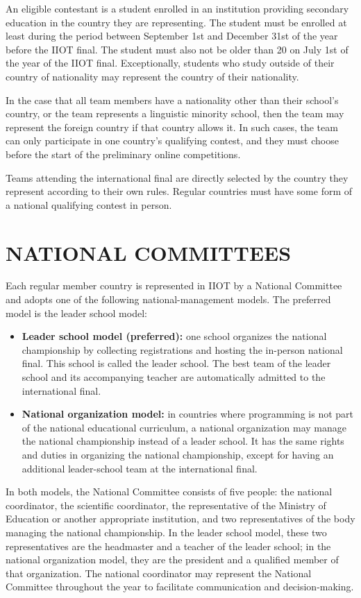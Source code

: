 \documentclass{article}
\begin{document}
An eligible contestant is a student enrolled in an institution providing secondary education in the country they are representing. The student must be enrolled at least during the period between September 1st and December 31st of the year before the IIOT final. The student must also not be older than 20 on July 1st of the year of the IIOT final. Exceptionally, students who study outside of their country of nationality may represent the country of their nationality. 

In the case that all team members have a nationality other than their school's country, or the team represents a linguistic minority school, then the team may represent the foreign country if that country allows it. In such cases, the team can only participate in one country's qualifying contest, and they must choose before the start of the preliminary online competitions. 

Teams attending the international final are directly selected by the country they represent according to their own rules. Regular countries must have some form of a national qualifying contest in person.

\section{NATIONAL COMMITTEES}

Each regular member country is represented in IIOT by a National Committee and adopts one of the following national-management models. The preferred model is the leader school model:

\begin{itemize}
    \item \textbf{Leader school model (preferred):} one school organizes the national championship by collecting registrations and hosting the in-person national final. This school is called the leader school. The best team of the leader school and its accompanying teacher are automatically admitted to the international final.
    \item \textbf{National organization model:} in countries where programming is not part of the national educational curriculum, a national organization may manage the national championship instead of a leader school. It has the same rights and duties in organizing the national championship, except for having an additional leader-school team at the international final.
\end{itemize}

In both models, the National Committee consists of five people: the national coordinator, the scientific coordinator, the representative of the Ministry of Education or another appropriate institution, and two representatives of the body managing the national championship. In the leader school model, these two representatives are the headmaster and a teacher of the leader school; in the national organization model, they are the president and a qualified member of that organization. The national coordinator may represent the National Committee throughout the year to facilitate communication and decision-making.
\end{document}
